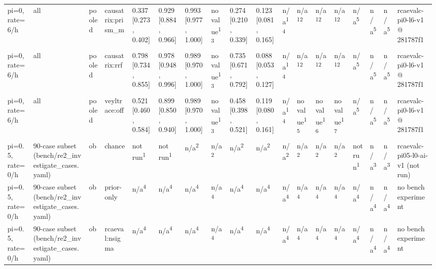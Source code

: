 \begin{table}[t]
\begin{tabular}{llllllllllllllllll}
pi=0, rate=6/h & all & pooled & causatrix:prism\_m & 0.337 [0.273, 0.402] & 0.929 [0.884, 0.966] & 0.993 [0.977, 1.000] & no value\textsuperscript{13} & 0.274 [0.210, 0.339] & 0.123 [0.081, 0.165] & n/a\textsuperscript{14} & n/a\textsuperscript{12} & n/a\textsuperscript{12} & n/a\textsuperscript{12} & n/a\textsuperscript{5} & n/a\textsuperscript{5} & n/a\textsuperscript{5} & rcaevalc-pi0-l6-v1 @ 281787f1 \\
pi=0, rate=6/h & all & pooled & causatrix:rrf & 0.798 [0.734, 0.855] & 0.978 [0.948, 0.996] & 0.989 [0.970, 1.000] & no value\textsuperscript{13} & 0.735 [0.671, 0.792] & 0.088 [0.053, 0.127] & n/a\textsuperscript{14} & n/a\textsuperscript{12} & n/a\textsuperscript{12} & n/a\textsuperscript{12} & n/a\textsuperscript{5} & n/a\textsuperscript{5} & n/a\textsuperscript{5} & rcaevalc-pi0-l6-v1 @ 281787f1 \\
pi=0, rate=6/h & all & pooled & veyltrace:off & 0.521 [0.460, 0.584] & 0.899 [0.850, 0.940] & 0.989 [0.970, 1.000] & no value\textsuperscript{13} & 0.458 [0.398, 0.521] & 0.119 [0.080, 0.161] & n/a\textsuperscript{14} & no value\textsuperscript{15} & no value\textsuperscript{16} & no value\textsuperscript{17} & n/a\textsuperscript{5} & n/a\textsuperscript{5} & n/a\textsuperscript{5} & rcaevalc-pi0-l6-v1 @ 281787f1 \\
pi=0.5, rate=0/h & 90-case subset (bench/re2\_investigate\_cases.yaml) & ob & chance & not run\textsuperscript{1} & not run\textsuperscript{1} & n/a\textsuperscript{2} & n/a\textsuperscript{2} & n/a\textsuperscript{2} & n/a\textsuperscript{2} & n/a\textsuperscript{2} & n/a\textsuperscript{2} & n/a\textsuperscript{2} & n/a\textsuperscript{2} & not run\textsuperscript{1} & n/a\textsuperscript{3} & n/a\textsuperscript{3} & rcaevalc-pi05-l0-ai-v1 (not run) \\
pi=0.5, rate=0/h & 90-case subset (bench/re2\_investigate\_cases.yaml) & ob & prior-only & n/a\textsuperscript{4} & n/a\textsuperscript{4} & n/a\textsuperscript{4} & n/a\textsuperscript{4} & n/a\textsuperscript{4} & n/a\textsuperscript{4} & n/a\textsuperscript{4} & n/a\textsuperscript{4} & n/a\textsuperscript{4} & n/a\textsuperscript{4} & n/a\textsuperscript{4} & n/a\textsuperscript{4} & n/a\textsuperscript{4} & no bench experiment \\
pi=0.5, rate=0/h & 90-case subset (bench/re2\_investigate\_cases.yaml) & ob & rcaeval:nsigma & n/a\textsuperscript{4} & n/a\textsuperscript{4} & n/a\textsuperscript{4} & n/a\textsuperscript{4} & n/a\textsuperscript{4} & n/a\textsuperscript{4} & n/a\textsuperscript{4} & n/a\textsuperscript{4} & n/a\textsuperscript{4} & n/a\textsuperscript{4} & n/a\textsuperscript{4} & n/a\textsuperscript{4} & n/a\textsuperscript{4} & no bench experiment \\

\end{tabular}
\end{table}
